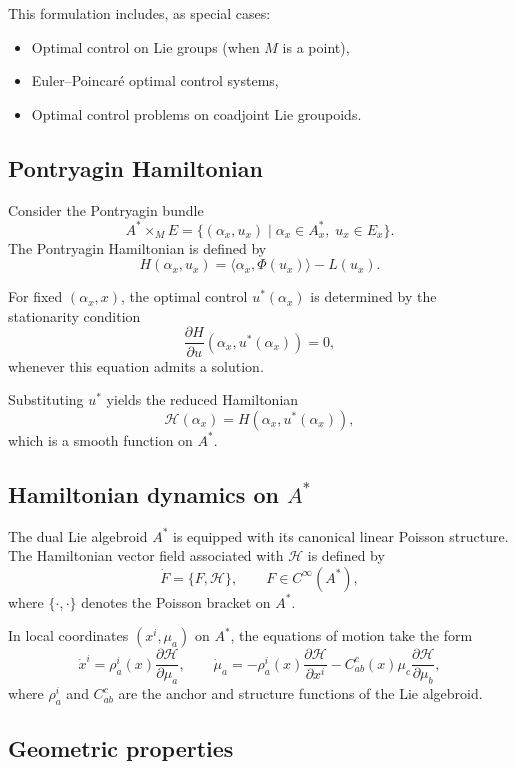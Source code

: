 \documentclass{article}
\begin{document}
This formulation includes, as special cases:
\begin{itemize}
\item Optimal control on Lie groups (when $M$ is a point),
\item Euler--Poincaré optimal control systems,
\item Optimal control problems on coadjoint Lie groupoids.
\end{itemize}

\subsection{Pontryagin Hamiltonian}

Consider the Pontryagin bundle
\[
A^* \times_M E = \{(\alpha_x,u_x) \mid \alpha_x \in A_x^*,\; u_x \in E_x\}.
\]
The Pontryagin Hamiltonian is defined by
\[
H(\alpha_x,u_x) = \langle \alpha_x, \Phi(u_x) \rangle - L(u_x).
\]

For fixed $(\alpha_x,x)$, the optimal control $u^*(\alpha_x)$ is determined by the stationarity condition
\[
\frac{\partial H}{\partial u}(\alpha_x,u^*(\alpha_x)) = 0,
\]
whenever this equation admits a solution.

Substituting $u^*$ yields the reduced Hamiltonian
\[
\mathcal{H}(\alpha_x) = H(\alpha_x,u^*(\alpha_x)),
\]
which is a smooth function on $A^*$.

\subsection{Hamiltonian dynamics on $A^*$}

The dual Lie algebroid $A^*$ is equipped with its canonical linear Poisson structure.  
The Hamiltonian vector field associated with $\mathcal{H}$ is defined by
\[
\dot{F} = \{F,\mathcal{H}\}, \qquad F \in C^\infty(A^*),
\]
where $\{\cdot,\cdot\}$ denotes the Poisson bracket on $A^*$.

In local coordinates $(x^i,\mu_a)$ on $A^*$, the equations of motion take the form
\[
\dot{x}^i = \rho_a^i(x)\frac{\partial \mathcal{H}}{\partial \mu_a}, \qquad
\dot{\mu}_a = -\rho_a^i(x)\frac{\partial \mathcal{H}}{\partial x^i}
- C_{ab}^c(x)\mu_c \frac{\partial \mathcal{H}}{\partial \mu_b},
\]
where $\rho_a^i$ and $C_{ab}^c$ are the anchor and structure functions of the Lie algebroid.

\subsection{Geometric properties}
\end{document}
